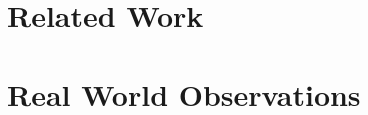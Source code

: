 \documentclass[11pt, a4paper]{tesis}
\begin{document}
\begin{abstract}
	
\end{abstract}

\setcounter{tocdepth}{2}
\tableofcontents

\newpage





\section{Related Work}









\section{Real World Observations}





{}
\end{document}
